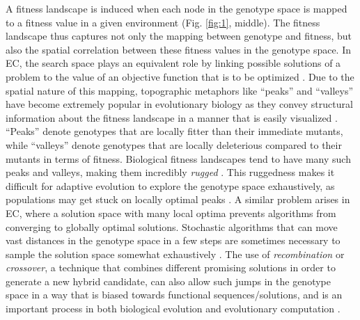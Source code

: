 A fitness landscape is induced when each node in the genotype space is mapped to a fitness value in a given environment (Fig. \ref{fig:1}, middle).
The fitness landscape thus captures not only the mapping between genotype and fitness, but also the spatial correlation between these fitness values in the genotype space.
In EC, the search space plays an equivalent role by linking possible solutions of a problem to the value of an objective function that is to be optimized \citep{back1996evolutionary, foster2001evolutionary, richter2014fitness}.
Due to the spatial nature of this mapping, topographic metaphors like ``peaks'' and ``valleys'' have become extremely popular in evolutionary biology as they convey structural information about the fitness landscape in a manner that is easily visualized \citep{martin2013multiple, steinberg2016environmental}.
``Peaks'' denote genotypes that are locally fitter than their immediate mutants, while ``valleys'' denote genotypes that are locally deleterious compared to their mutants in terms of fitness.
Biological fitness landscapes tend to have many such peaks and valleys, making them incredibly \textit{rugged} \citep{papkou2023rugged, reidys2001neutrality}.
This ruggedness makes it difficult for adaptive evolution to explore the genotype space exhaustively, as populations may get stuck on locally optimal peaks \citep{li2025probability, bank2022epistasis, neidhart2014adaptation}.
A similar problem arises in EC, where a solution space with many local optima prevents algorithms from converging to globally optimal solutions.
Stochastic algorithms that can move vast distances in the genotype space in a few steps are sometimes necessary to sample the solution space somewhat exhaustively \citep{fogel1994introduction, fouskakis2002stochastic}.
The use of \textit{recombination} or \textit{crossover}, a technique that combines different promising solutions in order to generate a new hybrid candidate, can also allow such jumps in the genotype space in a way that is biased towards functional sequences/solutions, and is an important process in both biological evolution and evolutionary computation \citep{li2024rapid, doerr2008crossover, fogel1994effectiveness}.

